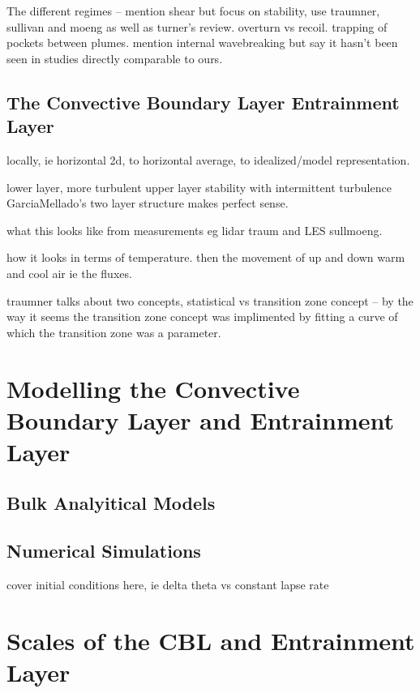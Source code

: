 The different regimes -- mention shear but focus on stability, use traumner, sullivan and moeng
as well as turner's review. overturn vs recoil.  trapping of pockets between plumes.  mention internal 
wavebreaking but say it hasn't been seen in studies directly comparable to ours.

\subsection{The Convective Boundary Layer Entrainment Layer}
\label{subsec:}

locally, ie horizontal 2d, to horizontal average, to idealized/model representation.

lower layer, more turbulent upper layer stability with intermittent turbulence
GarciaMellado's two layer structure makes perfect sense.

what this looks like from measurements eg lidar traum and LES sullmoeng.

how it looks in terms of temperature.  then the movement of up and down warm and cool air ie the 
fluxes.  

traumner talks about two concepts, statistical vs transition zone concept -- by the way it seems the transition zone concept
was implimented by fitting a curve of which the transition zone was a parameter.

\section{Modelling the Convective Boundary Layer and Entrainment Layer}
\label{sec:}

\subsection{Bulk Analyitical Models}
\label{subsec:}

\subsection{Numerical Simulations}
\label{subsec:}

cover initial conditions here, ie delta theta vs constant lapse rate

\section{Scales of the CBL and Entrainment Layer}
\label{sec:}

